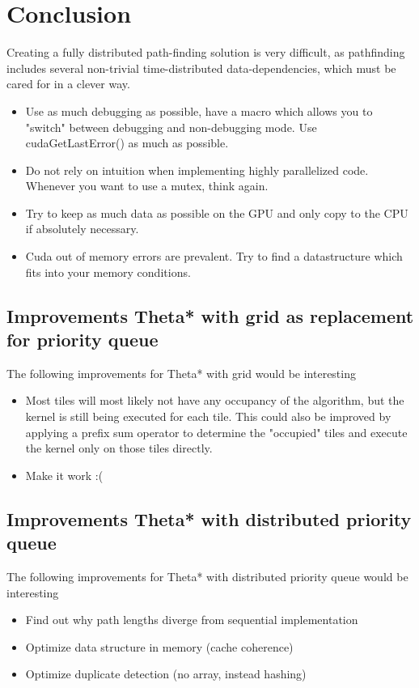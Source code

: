 \documentclass{article}
\begin{document}
\section{Conclusion}
%
Creating a fully distributed path-finding solution is very difficult, as pathfinding includes several non-trivial time-distributed data-dependencies, which must be cared for in a clever way.

\begin{itemize}
    \item Use as much debugging as possible, have a macro which allows you to "switch" between debugging and non-debugging mode. Use cudaGetLastError() as much as possible.
    \item Do not rely on intuition when implementing highly parallelized code. Whenever you want to use a mutex, think again.
    \item Try to keep as much data as possible on the GPU and only copy to the CPU if absolutely necessary.
    \item Cuda out of memory errors are prevalent. Try to find a datastructure which fits into your memory conditions.
\end{itemize}
%
\subsection{Improvements Theta* with grid as replacement for priority queue}
%
The following improvements for Theta* with grid would be interesting
\begin{itemize}
    \item Most tiles will most likely not have any occupancy of the algorithm, but the kernel is still being executed for each tile. This could also be improved by applying a prefix sum operator to determine the "occupied" tiles and execute the kernel only on those tiles directly.
    \item Make it work :(
\end{itemize}
%
\subsection{Improvements Theta* with distributed priority queue}
%
The following improvements for Theta* with distributed priority queue would be interesting
\begin{itemize}
    \item Find out why path lengths diverge from sequential implementation
    \item Optimize data structure in memory (cache coherence)
    \item Optimize duplicate detection (no array, instead hashing)
\end{itemize}
%
\end{document}
